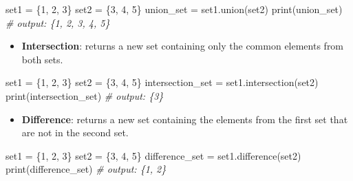 \documentclass[11pt]{article}
\providecommand{\tightlist}{%
      \setlength{\itemsep}{0pt}\setlength{\parskip}{0pt}}
\newenvironment{Shaded}{}{}
\newcommand{\DecValTok}[1]{\textcolor[rgb]{0.25,0.63,0.44}{{#1}}}
\newcommand{\CommentTok}[1]{\textcolor[rgb]{0.38,0.63,0.69}{\textit{{#1}}}}
\newcommand{\NormalTok}[1]{{#1}}
\newcommand{\OperatorTok}[1]{\textcolor[rgb]{0.40,0.40,0.40}{{#1}}}
\newcommand{\BuiltInTok}[1]{{#1}}
\begin{document}
\begin{Shaded}
\begin{Highlighting}[]
\NormalTok{set1 }\OperatorTok{=}\NormalTok{ \{}\DecValTok{1}\NormalTok{, }\DecValTok{2}\NormalTok{, }\DecValTok{3}\NormalTok{\}}
\NormalTok{set2 }\OperatorTok{=}\NormalTok{ \{}\DecValTok{3}\NormalTok{, }\DecValTok{4}\NormalTok{, }\DecValTok{5}\NormalTok{\}}
\NormalTok{union\_set }\OperatorTok{=}\NormalTok{ set1.union(set2)}
\BuiltInTok{print}\NormalTok{(union\_set) }\CommentTok{\# output: \{1, 2, 3, 4, 5\}}
\end{Highlighting}
\end{Shaded}

\begin{itemize}
\tightlist
\item
  \textbf{Intersection}: returns a new set containing only the common
  elements from both sets.
\end{itemize}

\begin{Shaded}
\begin{Highlighting}[]
\NormalTok{set1 }\OperatorTok{=}\NormalTok{ \{}\DecValTok{1}\NormalTok{, }\DecValTok{2}\NormalTok{, }\DecValTok{3}\NormalTok{\}}
\NormalTok{set2 }\OperatorTok{=}\NormalTok{ \{}\DecValTok{3}\NormalTok{, }\DecValTok{4}\NormalTok{, }\DecValTok{5}\NormalTok{\}}
\NormalTok{intersection\_set }\OperatorTok{=}\NormalTok{ set1.intersection(set2)}
\BuiltInTok{print}\NormalTok{(intersection\_set) }\CommentTok{\# output: \{3\}}
\end{Highlighting}
\end{Shaded}

\begin{itemize}
\tightlist
\item
  \textbf{Difference}: returns a new set containing the elements from
  the first set that are not in the second set.
\end{itemize}

\begin{Shaded}
\begin{Highlighting}[]
\NormalTok{set1 }\OperatorTok{=}\NormalTok{ \{}\DecValTok{1}\NormalTok{, }\DecValTok{2}\NormalTok{, }\DecValTok{3}\NormalTok{\}}
\NormalTok{set2 }\OperatorTok{=}\NormalTok{ \{}\DecValTok{3}\NormalTok{, }\DecValTok{4}\NormalTok{, }\DecValTok{5}\NormalTok{\}}
\NormalTok{difference\_set }\OperatorTok{=}\NormalTok{ set1.difference(set2)}
\BuiltInTok{print}\NormalTok{(difference\_set) }\CommentTok{\# output: \{1, 2\}}
\end{Highlighting}
\end{Shaded}
\end{document}
